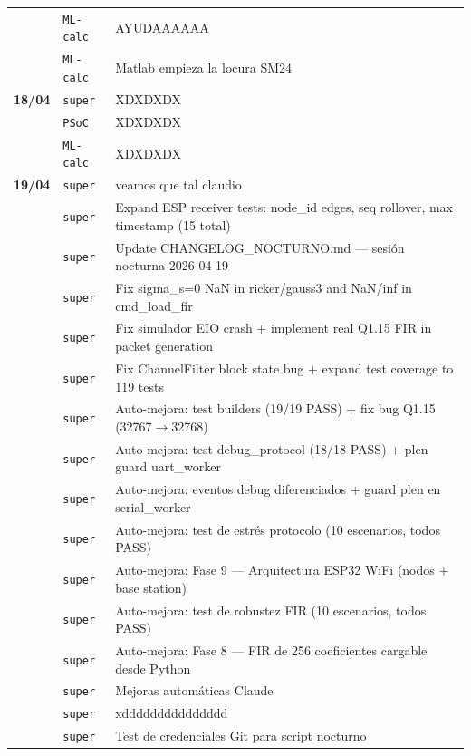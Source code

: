 \begin{longtable}{@{}p{1.7cm} p{1.5cm} p{12.2cm}@{}}
 & \texttt{\scriptsize ML-calc} & AYUDAAAAAA \\
 & \texttt{\scriptsize ML-calc} & Matlab empieza la locura SM24 \\
\textbf{18/04} & \texttt{\scriptsize super} & XDXDXDX \\
 & \texttt{\scriptsize PSoC} & XDXDXDX \\
 & \texttt{\scriptsize ML-calc} & XDXDXDX \\
\textbf{19/04} & \texttt{\scriptsize super} & veamos que tal claudio \\
 & \texttt{\scriptsize super} & Expand ESP receiver tests: node\_id edges, seq rollover, max timestamp (15 total) \\
 & \texttt{\scriptsize super} & Update CHANGELOG\_NOCTURNO.md --- sesión nocturna 2026-04-19 \\
 & \texttt{\scriptsize super} & Fix sigma\_s=0 NaN in ricker/gauss3 and NaN/inf in cmd\_load\_fir \\
 & \texttt{\scriptsize super} & Fix simulador EIO crash + implement real Q1.15 FIR in packet generation \\
 & \texttt{\scriptsize super} & Fix ChannelFilter block state bug + expand test coverage to 119 tests \\
 & \texttt{\scriptsize super} & Auto-mejora: test builders (19/19 PASS) + fix bug Q1.15 (32767$\rightarrow$32768) \\
 & \texttt{\scriptsize super} & Auto-mejora: test debug\_protocol (18/18 PASS) + plen guard uart\_worker \\
 & \texttt{\scriptsize super} & Auto-mejora: eventos debug diferenciados + guard plen en serial\_worker \\
 & \texttt{\scriptsize super} & Auto-mejora: test de estrés protocolo (10 escenarios, todos PASS) \\
 & \texttt{\scriptsize super} & Auto-mejora: Fase 9 --- Arquitectura ESP32 WiFi (nodos + base station) \\
 & \texttt{\scriptsize super} & Auto-mejora: test de robustez FIR (10 escenarios, todos PASS) \\
 & \texttt{\scriptsize super} & Auto-mejora: Fase 8 --- FIR de 256 coeficientes cargable desde Python \\
 & \texttt{\scriptsize super} & Mejoras automáticas Claude \\
 & \texttt{\scriptsize super} & xddddddddddddddd \\
 & \texttt{\scriptsize super} & Test de credenciales Git para script nocturno \\

\end{longtable}
